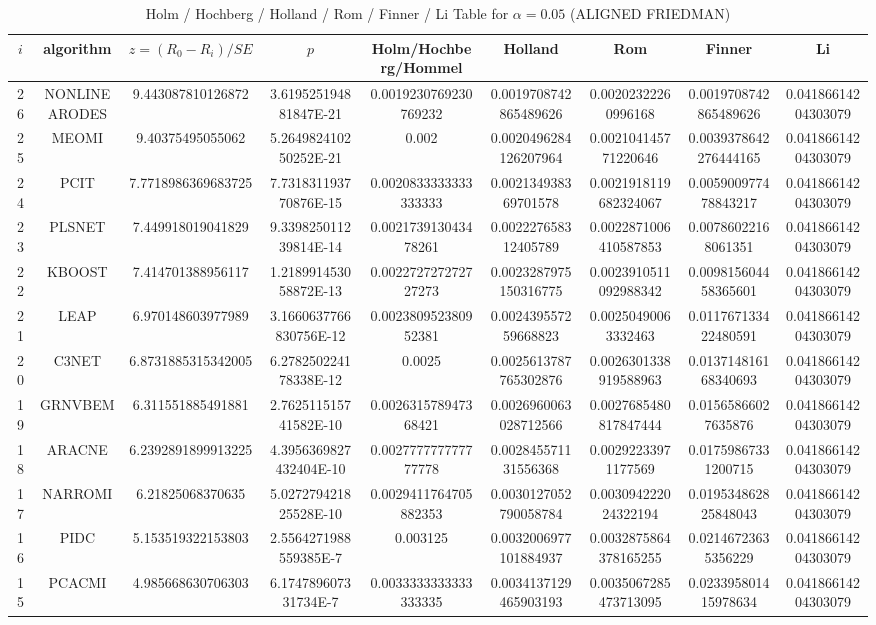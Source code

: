 \documentclass[a4paper,10pt]{article}
\begin{document}
\begin{landscape}
\begin{table}[!htp]
\centering\scriptsize
\caption{Holm / Hochberg / Holland / Rom / Finner / Li Table for $\alpha=0.05$ (ALIGNED FRIEDMAN)}
\begin{tabular}{ccccccccc}
$i$&algorithm&$z=(R_0 - R_i)/SE$&$p$&Holm/Hochberg/Hommel&Holland&Rom&Finner&Li\\
\hline
26&NONLINEARODES&9.443087810126872&3.619525194881847E-21&0.0019230769230769232&0.0019708742865489626&0.00202322260996168&0.0019708742865489626&0.04186614204303079\\
25&MEOMI&9.40375495055062&5.264982410250252E-21&0.002&0.0020496284126207964&0.002104145771220646&0.0039378642276444165&0.04186614204303079\\
24&PCIT&7.7718986369683725&7.731831193770876E-15&0.0020833333333333333&0.002134938369701578&0.0021918119682324067&0.005900977478843217&0.04186614204303079\\
23&PLSNET&7.449918019041829&9.339825011239814E-14&0.002173913043478261&0.002227658312405789&0.0022871006410587853&0.00786022168061351&0.04186614204303079\\
22&KBOOST&7.414701388956117&1.218991453058872E-13&0.002272727272727273&0.0023287975150316775&0.0023910511092988342&0.009815604458365601&0.04186614204303079\\
21&LEAP&6.970148603977989&3.1660637766830756E-12&0.002380952380952381&0.002439557259668823&0.00250490063332463&0.011767133422480591&0.04186614204303079\\
20&C3NET&6.8731885315342005&6.278250224178338E-12&0.0025&0.0025613787765302876&0.0026301338919588963&0.013714816168340693&0.04186614204303079\\
19&GRNVBEM&6.311551885491881&2.762511515741582E-10&0.002631578947368421&0.0026960063028712566&0.0027685480817847444&0.01565866027635876&0.04186614204303079\\
18&ARACNE&6.2392891899913225&4.3956369827432404E-10&0.002777777777777778&0.002845571131556368&0.00292233971177569&0.01759867331200715&0.04186614204303079\\
17&NARROMI&6.21825068370635&5.027279421825528E-10&0.0029411764705882353&0.0030127052790058784&0.003094222024322194&0.019534862825848043&0.04186614204303079\\
16&PIDC&5.153519322153803&2.5564271988559385E-7&0.003125&0.0032006977101884937&0.0032875864378165255&0.02146723635356229&0.04186614204303079\\
15&PCACMI&4.985668630706303&6.174789607331734E-7&0.0033333333333333335&0.0034137129465903193&0.0035067285473713095&0.023395801415978634&0.04186614204303079\\

\end{tabular}
\end{table}
\end{landscape}
\end{document}
